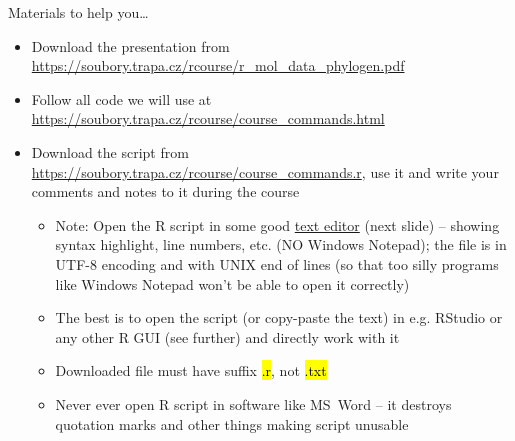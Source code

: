\documentclass[compress, ucs, xelatex, 11pt, xcolor=svgnames,
  hyperref={
    bookmarks=true,
    unicode=true,
    colorlinks=true,
    pdftitle={Molecular data in R},
    plainpages=false,
    pdfauthor={Vojtech Zeisek},
    pdfsubject={Course about phylogeny and evolution in R},
    pdfcreator={XeLaTeX},
    pdfkeywords={R, evolution, phylogeny, molecular data},
    linkcolor=Tomato,
    anchorcolor=SaddleBrown,
    citecolor=Goldenrod,
    filecolor=DarkMagenta,
    menucolor=Sienna,
    urlcolor=DarkTurquoise,
    pdftex},
  url={hyphens, lowtilde} %
  ]{beamer}
\renewcommand{\texttt}[1]{\hl{\ttfamily #1}}
\begin{document}
\begin{frame}{Materials to help you\ldots}
  \begin{itemize}
    \item Download the presentation from \url{https://soubory.trapa.cz/rcourse/r_mol_data_phylogen.pdf}
    \item Follow all code we will use at \url{https://soubory.trapa.cz/rcourse/course_commands.html}
    \item Download the script from \url{https://soubory.trapa.cz/rcourse/course_commands.r}, use it and write your comments and notes to it during the course
    \begin{itemize}
      \item \alert{Note:} Open the R script in some \alert{good} \href{http://texteditors.org/cgi-bin/wiki.pl?PickingATextEditor}{text editor} (next slide) -- showing syntax highlight, line numbers, etc. (\alert{NO} Windows Notepad); the file is in UTF-8 encoding and with UNIX end of lines (so that too silly programs like Windows Notepad won't be able to open it correctly)
      \item The best is to open the script (or copy-paste the text) in e.g. RStudio or any other R GUI (see further) and directly work with it
      \item \alert{Downloaded file must have suffix \texttt{*.r}, not \texttt{*.txt}}
      \item \alert{Never ever} open R script in software like MS~Word -- it destroys quotation marks and other things making script unusable
    \end{itemize}
  \end{itemize}
\end{frame}
\end{document}
